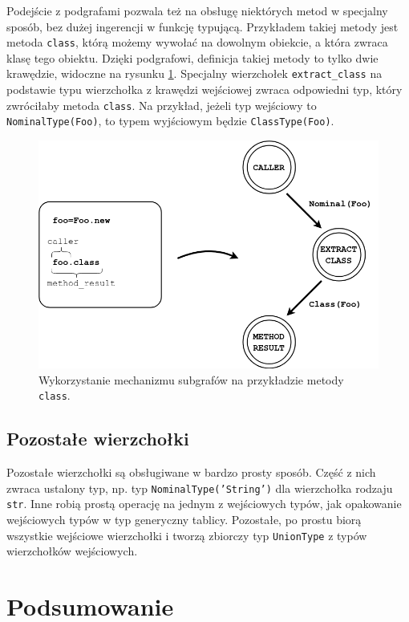 \documentclass[shortabstract,mgr]{iithesis}
\begin{document}
Podejście z podgrafami pozwala też na obsługę niektórych metod w specjalny sposób, bez dużej ingerencji w funkcję typującą. Przykładem takiej metody jest metoda \texttt{class}, którą możemy wywołać na dowolnym obiekcie, a która zwraca klasę tego obiektu. Dzięki podgrafowi, definicja takiej metody to tylko dwie krawędzie, widoczne na rysunku \ref{fig:extract-class}. Specjalny wierzchołek \texttt{extract\_class} na podstawie typu wierzchołka z krawędzi wejściowej zwraca odpowiedni typ, który zwróciłaby metoda \texttt{class}. Na przykład, jeżeli typ wejściowy to \texttt{NominalType(Foo)}, to typem wyjściowym będzie \texttt{ClassType(Foo)}.

\begin{figure}[htb]
    \centering
    \includegraphics[scale=0.4]{imgs/extract-class.png}
    \caption{Wykorzystanie mechanizmu subgrafów na przykładzie metody \texttt{class}.}
    \label{fig:extract-class}
\end{figure}

\section{Pozostałe wierzchołki}

Pozostałe wierzchołki są obsługiwane w bardzo prosty sposób. Część z nich zwraca ustalony typ, np. typ \texttt{NominalType('String')} dla wierzchołka rodzaju \texttt{str}. Inne robią prostą operację na jednym z wejściowych typów, jak opakowanie wejściowych typów w typ generyczny tablicy. Pozostałe, po prostu biorą wszystkie wejściowe wierzchołki i tworzą zbiorczy typ \texttt{UnionType} z typów wierzchołków wejściowych.


\chapter{Podsumowanie}
\end{document}

